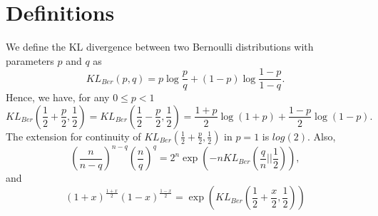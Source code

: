 \section{Definitions}
We define the KL divergence between two Bernoulli distributions with parameters $p$ and $q$ as
\[
KL_{Ber}(p,q)= p \log\frac{p}{q} + (1-p) \log\frac{1-p}{1-q}.
\]
Hence, we have, for any $ 0\leq p < 1$
\[
KL_{Ber}(\frac{1}{2}+\frac{p}{2},\frac{1}{2}) = KL_{Ber}(\frac{1}{2}-\frac{p}{2},\frac{1}{2})= \frac{1+p}{2} \log(1+p) + \frac{1-p}{2} \log(1-p).
\]
The extension for continuity of $KL_{Ber}(\frac{1}{2}+\frac{p}{2},\frac{1}{2})$ in $p=1$ is $log(2)$.
Also,
\[
\left(\frac{n}{n-q}\right)^{n-q} \left(\frac{n}{q}\right)^{q} = 2^n \exp\left(-n KL_{Ber}(\frac{q}{n}||\frac{1}{2})\right),
\]
and
\[
\left(1+x\right)^\frac{1+x}{2} \left(1-x\right)^\frac{1-x}{2}= \exp\left( KL_{Ber}(\frac{1}{2}+\frac{x}{2},\frac{1}{2}) \right)
\]